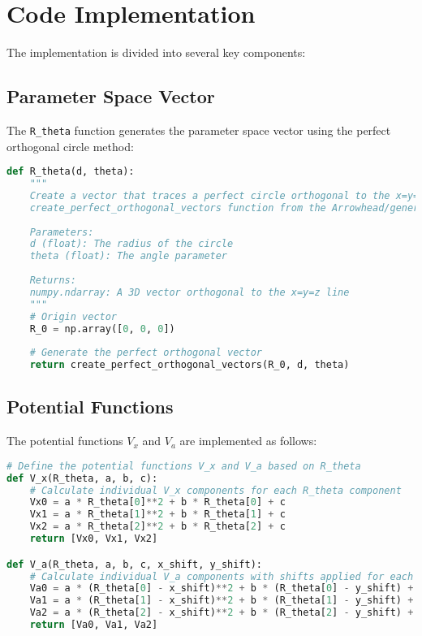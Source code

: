 \documentclass[12pt,a4paper]{article}
\begin{document}
\section{Code Implementation}

The implementation is divided into several key components:

\subsection{Parameter Space Vector}

The \texttt{R\_theta} function generates the parameter space vector using the perfect orthogonal circle method:

\begin{lstlisting}[language=Python, caption=R\_theta function]
def R_theta(d, theta):
    """
    Create a vector that traces a perfect circle orthogonal to the x=y=z line using the
    create_perfect_orthogonal_vectors function from the Arrowhead/generalized package.
    
    Parameters:
    d (float): The radius of the circle
    theta (float): The angle parameter
    
    Returns:
    numpy.ndarray: A 3D vector orthogonal to the x=y=z line
    """
    # Origin vector
    R_0 = np.array([0, 0, 0])
    
    # Generate the perfect orthogonal vector
    return create_perfect_orthogonal_vectors(R_0, d, theta)
\end{lstlisting}

\subsection{Potential Functions}

The potential functions $V_x$ and $V_a$ are implemented as follows:

\begin{lstlisting}[language=Python, caption=Potential functions]
# Define the potential functions V_x and V_a based on R_theta
def V_x(R_theta, a, b, c):
    # Calculate individual V_x components for each R_theta component
    Vx0 = a * R_theta[0]**2 + b * R_theta[0] + c
    Vx1 = a * R_theta[1]**2 + b * R_theta[1] + c
    Vx2 = a * R_theta[2]**2 + b * R_theta[2] + c
    return [Vx0, Vx1, Vx2]

def V_a(R_theta, a, b, c, x_shift, y_shift):
    # Calculate individual V_a components with shifts applied for each R_theta component
    Va0 = a * (R_theta[0] - x_shift)**2 + b * (R_theta[0] - y_shift) + c
    Va1 = a * (R_theta[1] - x_shift)**2 + b * (R_theta[1] - y_shift) + c
    Va2 = a * (R_theta[2] - x_shift)**2 + b * (R_theta[2] - y_shift) + c
    return [Va0, Va1, Va2]
\end{lstlisting}
\end{document}
